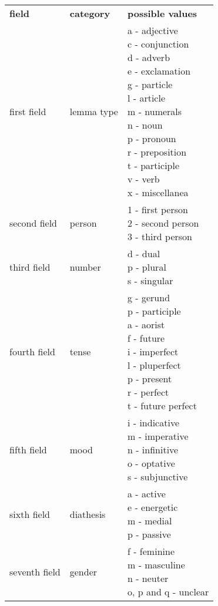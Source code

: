 \begin{table}
  \begin{tabular}{|l|l|l|}
    \hline
    \textbf{field}            & \textbf{category} & \textbf{possible values} \\ \thickhline
    first field  & lemma type & \specialcell{a - adjective\\c - conjunction\\d - adverb\\e - exclamation\\g - particle\\l - article\\m - numerals\\n - noun\\p - pronoun\\r - preposition\\t - participle\\v - verb\\x - miscellanea} \\ \hline
    second field & person & \specialcell{1 - first person\\2 - second person\\3 - third person} \\ \hline
    third field  & number & \specialcell{d - dual\\p - plural\\s - singular} \\ \hline
    fourth field & tense & \specialcell{g - gerund \\ p - participle \\ a - aorist\\f - future\\i - imperfect\\l - pluperfect\\p - present\\r - perfect\\t - future perfect} \\ \hline
    fifth field & mood & \specialcell{i - indicative\\m - imperative\\n - infinitive\\o - optative\\s - subjunctive} \\ \hline
    sixth field & diathesis & \specialcell{a - active\\e - energetic\\m - medial\\p - passive} \\ \hline
    seventh field & gender & \specialcell{f - feminine\\m - masculine\\n - neuter\\ o, p and q - unclear} \\ \hline

\end{tabular}
\end{table}
